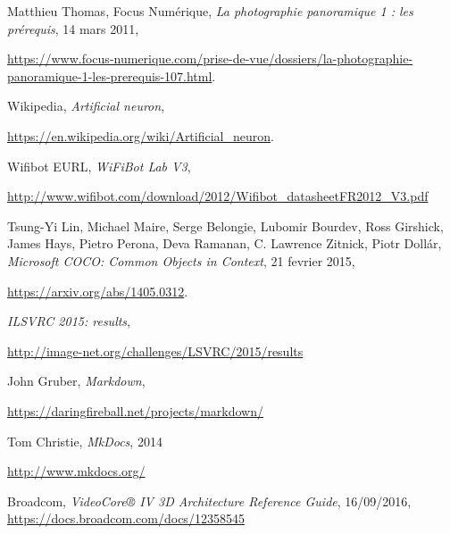 \begin{thebibliography}{9}
		Matthieu Thomas,
		Focus Numérique,
		\emph{La photographie panoramique 1 : les prérequis},
		14 mars 2011,
		\par
		\url{https://www.focus-numerique.com/prise-de-vue/dossiers/la-photographie-panoramique-1-les-prerequis-107.html}.

		Wikipedia,
		\emph{Artificial neuron},
		\par
		\url{https://en.wikipedia.org/wiki/Artificial_neuron}.

		Wifibot EURL,
		\emph{WiFiBot Lab V3},
		\par
		\url{http://www.wifibot.com/download/2012/Wifibot_datasheetFR2012_V3.pdf}
		
		
		Tsung-Yi Lin, Michael Maire, Serge Belongie, Lubomir Bourdev, Ross Girshick, James Hays, Pietro Perona, Deva Ramanan, C. Lawrence Zitnick, Piotr Dollár,
		\emph{Microsoft COCO: Common Objects in Context},
		21 fevrier 2015,
		\par
		\url{https://arxiv.org/abs/1405.0312}.

		\emph{ILSVRC 2015: results},
		\par
		\url{http://image-net.org/challenges/LSVRC/2015/results}
		
		John Gruber,
		\emph{Markdown},
		\par
		\url{https://daringfireball.net/projects/markdown/}

		Tom Christie,
		\emph{MkDocs},
		2014
		\par
		\url{http://www.mkdocs.org/}

		Broadcom,
		\emph{VideoCore® IV 3D Architecture Reference Guide},
		16/09/2016,
		\url{https://docs.broadcom.com/docs/12358545}

\end{thebibliography}
